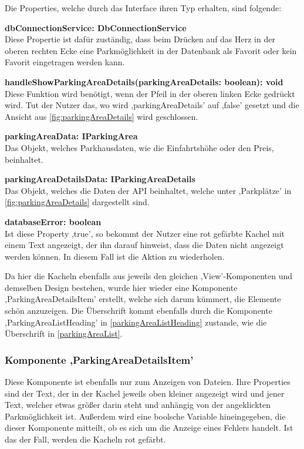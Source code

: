 Die Properties, welche durch das Interface ihren Typ erhalten, sind folgende: 
\begin{description}
	\item \textbf{dbConnectionService: DbConnectionService} \\ Diese Propertie ist dafür zuständig, dass beim Drücken auf das Herz in der oberen rechten Ecke eine Parkmöglichkeit in der Datenbank als Favorit oder kein Favorit eingetragen werden kann.
	\item \textbf{handleShowParkingAreaDetails(parkingAreaDetails: boolean): void} \\ Diese Funktion wird benötigt, wenn der Pfeil in der oberen linken Ecke gedrückt wird. Tut der Nutzer das, wo wird ,parkingAreaDetails' auf ,false' gesetzt und die Ansicht aus \autoref{fig:parkingAreaDetails} wird geschlossen.
	\item \textbf{parkingAreaData: IParkingArea} \\ Das Objekt, welches Parkhausdaten, wie die Einfahrtshöhe oder den Preis, beinhaltet.
	\item \textbf{parkingAreaDetailsData: IParkingAreaDetails} \\ Das Objekt, welches die Daten der API beinhaltet, welche unter ,Parkplätze' in \autoref{fig:parkingAreaDetails} dargestellt sind.
	\item \textbf{databaseError: boolean} \\ Ist diese Property ,true', so bekommt der Nutzer eine rot gefärbte Kachel mit einem Text angezeigt, der ihn darauf hinweist, dass die Daten nicht angezeigt werden können. In diesem Fall ist die Aktion zu wiederholen.
\end{description}

Da hier die Kacheln ebenfalls aus jeweils den gleichen ,View'-Komponenten und demselben Design bestehen, wurde hier wieder eine Komponente ,ParkingAreaDetailsItem' erstellt, welche sich darum kümmert, die Elemente schön anzuzeigen. Die Überschrift kommt ebenfalls durch die Komponente ,ParkingAreaListHeading' in \autoref{parkingAreaListHeading} zustande, wie die Überschrift in \autoref{parkingAreaList}.

\subsubsection{Komponente ,ParkingAreaDetailsItem'}
Diese Komponente ist ebenfalls nur zum Anzeigen von Dateien. Ihre Properties sind der Text, der in der Kachel jeweils oben kleiner angezeigt wird und jener Text, welcher etwas größer darin steht und anhängig von der angeklickten Parkmöglichkeit ist. Außerdem wird eine boolsche Variable hineingegeben, die dieser Komponente mitteilt, ob es sich um die Anzeige eines Fehlers handelt. Ist das der Fall, werden die Kacheln rot gefärbt.

